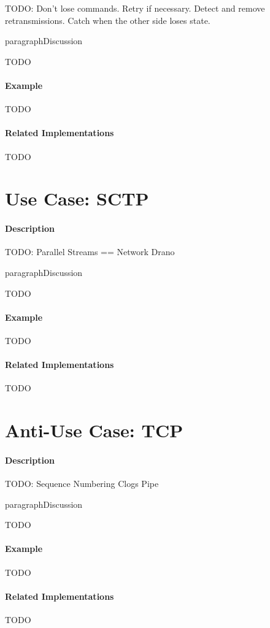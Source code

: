 {\Large TODO:} Don't lose commands. Retry if necessary. Detect and remove retransmissions. Catch when the other side loses state.

paragraph{Discussion}

{\Large TODO}

\paragraph{Example}

{\Large TODO}

\paragraph{Related Implementations}

{\Large TODO}

\section{Use Case: SCTP}

\paragraph{Description}

{\Large TODO:} Parallel Streams == Network Drano\texttrademark

paragraph{Discussion}

{\Large TODO}

\paragraph{Example}

{\Large TODO}

\paragraph{Related Implementations}

{\Large TODO}

\section{Anti-Use Case: TCP}

\paragraph{Description}

{\Large TODO:} Sequence Numbering Clogs Pipe

paragraph{Discussion}

{\Large TODO}

\paragraph{Example}

{\Large TODO}

\paragraph{Related Implementations}

{\Large TODO}